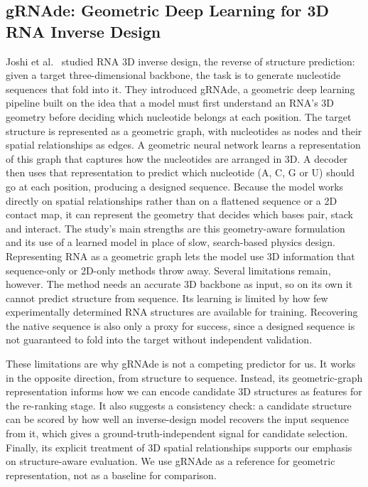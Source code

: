 \documentclass{FastFyp}
\begin{document}
\subsection{gRNAde: Geometric Deep Learning for 3D RNA Inverse Design}
Joshi et al.~\cite{joshi2025grnade} studied RNA 3D inverse design, the reverse of structure prediction: given a target three-dimensional backbone, the task is to generate nucleotide sequences that fold into it. They introduced gRNAde, a geometric deep learning pipeline built on the idea that a model must first understand an RNA's 3D geometry before deciding which nucleotide belongs at each position. The target structure is represented as a geometric graph, with nucleotides as nodes and their spatial relationships as edges. A geometric neural network learns a representation of this graph that captures how the nucleotides are arranged in 3D. A decoder then uses that representation to predict which nucleotide (A, C, G or U) should go at each position, producing a designed sequence. Because the model works directly on spatial relationships rather than on a flattened sequence or a 2D contact map, it can represent the geometry that decides which bases pair, stack and interact. The study's main strengths are this geometry-aware formulation and its use of a learned model in place of slow, search-based physics design. Representing RNA as a geometric graph lets the model use 3D information that sequence-only or 2D-only methods throw away. Several limitations remain, however. The method needs an accurate 3D backbone as input, so on its own it cannot predict structure from sequence. Its learning is limited by how few experimentally determined RNA structures are available for training. Recovering the native sequence is also only a proxy for success, since a designed sequence is not guaranteed to fold into the target without independent validation.

These limitations are why gRNAde is not a competing predictor for us. It works in the opposite direction, from structure to sequence. Instead, its geometric-graph representation informs how we can encode candidate 3D structures as features for the re-ranking stage. It also suggests a consistency check: a candidate structure can be scored by how well an inverse-design model recovers the input sequence from it, which gives a ground-truth-independent signal for candidate selection. Finally, its explicit treatment of 3D spatial relationships supports our emphasis on structure-aware evaluation. We use gRNAde as a reference for geometric representation, not as a baseline for comparison.
\end{document}

